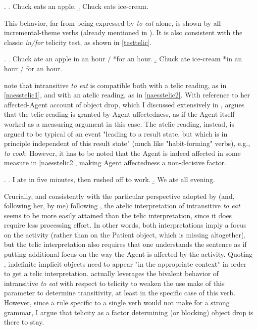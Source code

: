 \ex. \label{tennytelic} \a. \label{tennytelic1} Chuck eats an apple.
\b. \label{tennytelic2} Chuck eats ice-cream.

This behavior, far from being expressed by \textit{to eat} alone, is shown by all incremental-theme verbs (already mentioned in ). It is also consistent with the classic \textit{in/for} telicity test, as shown in \ref{testtelic}.

\ex. \label{testtelic} \a. \label{testtelic1} Chuck ate an apple in an hour / *for an hour.
\b. \label{testtelic2} Chuck ate ice-cream *in an hour / for an hour.

\textcite{Naess2007, Ruda2017, willim2006event, Naess2011} note that intransitive \textit{to eat} is compatible both with a telic reading, as in \ref{naesstelic1}, and with an atelic reading, as in \ref{naesstelic2}. With reference to her affected-Agent account of object drop, which I discussed extensively in , \textcite[78-79]{Naess2007} argues that the telic reading is granted by Agent affectedness, as if the Agent itself worked as a measuring argument in this case. The atelic reading, instead, is argued to be typical of an event "leading to a result state, but which is in principle independent of this result state" (much like  "habit-forming" verbs), e.g., \textit{to cook}. However, it has to be noted that the Agent is indeed affected in some measure in \ref{naesstelic2}, making Agent affectedness a non-decisive factor. 

\ex. \label{naesstelic} \a. \label{naesstelic1} I ate in five minutes, then rushed off to work.
\b. \label{naesstelic2} We ate all evening.

Crucially, and consistently with the particular perspective adopted by \textcite{Medina2007} (and, following her, by me) following \textcite{Olsen1997}, the atelic interpretation of intransitive \textit{to eat} seems to be more easily attained than the telic interpretation, since it does require less processing effort. In other words, both interpretations imply a focus on the activity (rather than on the Patient object, which is missing altogether), but the telic interpretation also requires that one understands the sentence as if putting additional focus on the way the Agent is affected by the activity. Quoting \textcite[4]{OlsenResnik1997}, indefinite implicit objects need to appear "in the appropriate context" in order to get a telic interpretation. \textcite[79]{Naess2007} actually leverages the bivalent behavior of intransitive \textit{to eat} with respect to telicity to weaken the use \textcite{HopperThompson1980} make of this parameter to determine transitivity, at least in the specific case of this verb. However, since a rule specific to a single verb would not make for a strong grammar, I argue that telicity as a factor determining (or blocking) object drop is there to stay.

